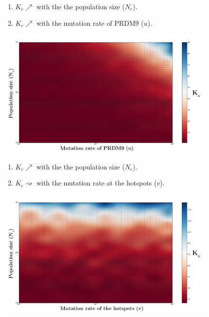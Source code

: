 \documentclass[10pt]{beamer}
\begin{document}
\begin{frame}
	\begin{center}
		\begin{enumerate}
		\item $K_e \nearrow$ with the the population size ($N_e$).
		
		\item $K_e \nearrow$ with the mutation rate of PRDM9 ($u$).
		\end{enumerate}
       \includegraphics[width=11cm]{Images/simpson-entropy-population-mutation.png}
	\end{center}
\end{frame}

\begin{frame}
	\begin{center}
		\begin{enumerate}
		\item $K_e \nearrow$ with the the population size ($N_e$).
		
		\item $K_e \rightsquigarrow$ with the mutation rate at the hotspots ($v$).
		\end{enumerate}
       \includegraphics[width=11cm]{Images/simpson-entropy-population-erosion.png}
	\end{center}
\end{frame}
\end{document}
